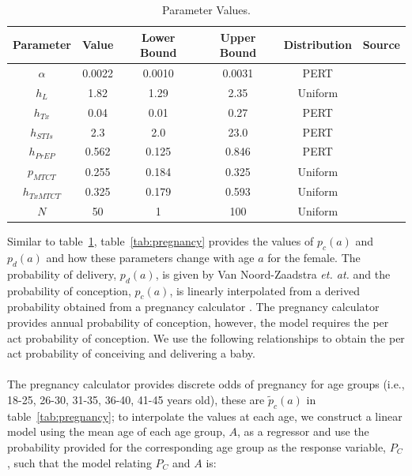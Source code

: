 \documentclass[11pt]{nih_mod}
\begin{document}
\begin{table}[H]
\begin{center}
  \colorbox{ECback}{
\begin{tabular}{|c|c|c|c|c|c|}
\hline
Parameter & Value& Lower Bound& Upper Bound& Distribution & Source\\
\hline
\hline
$\alpha$& 0.0022 &0.0010 & 0.0031 & PERT & \cite{Smith2010, Gray2012}\\
$h_L$ & 1.82 & 1.29 & 2.35& Uniform & \cite{Smith2010}\\
$h_{Tx}$ & 0.04 &0.01&0.27 & PERT & \cite{Cohen2011} \\ 
$h_{STIs}$ & 2.3 & 2.0 & 23.0 & PERT & \cite{Fleming1999, Gray2012} \\
$h_{PrEP}$ & 0.562 & 0.125 & 0.846 & PERT & \cite{Karim2010,Myers2011} \\
$p_{MTCT}$ & 0.255 & 0.184 & 0.325 & Uniform & \cite{Connor1994,Cock2000}\\
$h_{TxMTCT}$ & 0.325 &0.179 & 0.593 & Uniform & \cite{Connor1994,Zutlevics2006} \\
$N$ & 50 & 1 & 100 & Uniform & \\
\hline
\end{tabular}}
	\caption{Parameter Values. \label{tab:parameters}}
\end{center}
\end{table} 

Similar to table~\ref{tab:parameters}, table~\ref{tab:pregnancy} provides the values of $p_c(a)$ and $p_d(a)$ and how these parameters change with age $a$ for the female.  The probability of delivery, $p_d(a)$, is given by Van Noord-Zaadstra {\it et. at.} \cite{Noord-Zaadstra1991} and the probability of conception, $p_c(a)$, is linearly interpolated from a derived probability obtained from a pregnancy calculator \cite{CalculatorsLive2012}. The pregnancy calculator provides annual probability of conception, however, the model requires the per act probability of conception.  We use the following relationships to obtain the per act probability of conceiving and delivering a baby. \\ 
\\
The pregnancy calculator provides discrete odds of pregnancy for age groups (i.e., 18-25, 26-30, 31-35, 36-40, 41-45 years old), these are ${\tilde{p}_c(a)}$ in  table~\ref{tab:pregnancy}; to interpolate the values at each age, we construct a linear model using the mean age of each age group, $A$, as a regressor and use the probability provided for the corresponding age group as the response variable, $P_C$, such that the model relating $P_C$ and $A$ is:
\end{document}
